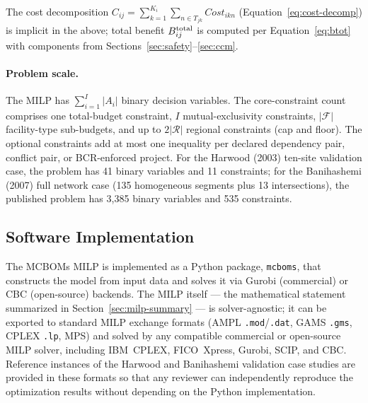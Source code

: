 \noindent The cost decomposition $C_{ij} = \sum_{k=1}^{K_i} \sum_{n \in T_{jk}}
\mathit{Cost}_{ikn}$ (Equation~\ref{eq:cost-decomp}) is implicit in the
above; total benefit $B^{\mathrm{total}}_{ij}$ is computed per Equation~\ref{eq:btot}
with components from Sections~\ref{sec:safety}--\ref{sec:ccm}.

\paragraph{Problem scale.} The MILP has $\sum_{i=1}^{I} |A_i|$ binary
decision variables. The core-constraint count comprises one total-budget
constraint, $I$ mutual-exclusivity constraints, $|\mathcal{F}|$
facility-type sub-budgets, and up to $2|\mathcal{R}|$ regional constraints
(cap and floor). The optional constraints add at most one inequality per
declared dependency pair, conflict pair, or BCR-enforced project. For the
Harwood (2003) ten-site validation case, the problem has 41 binary
variables and 11 constraints; for the Banihashemi (2007) full network
case (135 homogeneous segments plus 13 intersections), the published
problem has 3{,}385 binary variables and 535 constraints.

\subsection{Software Implementation}

The MCBOMs MILP is implemented as a Python package, \texttt{mcboms}, that
constructs the model from input data and solves it via Gurobi
(commercial) or CBC (open-source) backends. The MILP itself --- the
mathematical statement summarized in
Section~\ref{sec:milp-summary} --- is solver-agnostic; it can be exported
to standard MILP exchange formats (AMPL \texttt{.mod}/\texttt{.dat},
GAMS \texttt{.gms}, CPLEX \texttt{.lp}, MPS) and solved by any compatible
commercial or open-source MILP solver, including IBM~CPLEX, FICO~Xpress,
Gurobi, SCIP, and CBC. Reference instances of the Harwood and
Banihashemi validation case studies are provided in these formats so
that any reviewer can independently reproduce the optimization results
without depending on the Python implementation.

